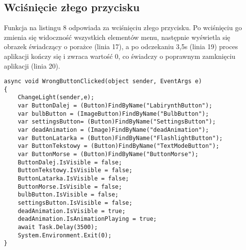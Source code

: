 \subsection{Wciśnięcie złego przycisku}
\hspace{0.60cm}Funkcja na listingu 8 odpowiada za wciśnięciu złego przycisku. Po wciśnięciu go zmienia się widoczność wszystkich elementów menu, następnie wyświetla się obrazek świadczący o porażce (linia 17), a po odczekaniu 3,5s (linia 19) proces aplikacji kończy się i zwraca wartość 0, co świadczy o poprawnym zamknięciu aplikacji (linia 20).

\begin{lstlisting}[caption=WrongButton]
async void WrongButtonClicked(object sender, EventArgs e)
{
	ChangeLight(sender,e);
	var ButtonDalej = (Button)FindByName("LabirynthButton");
	var bulbButton = (ImageButton)FindByName("BulbButton");
	var settingsButton= (Button)FindByName("SettingsButton");
	var deadAnimation = (Image)FindByName("deadAnimation");
	var ButtonLatarka = (Button)FindByName("FlashlightButton");
	var ButtonTekstowy = (Button)FindByName("TextModeButton");
	var ButtonMorse = (Button)FindByName("ButtonMorse");
	ButtonDalej.IsVisible = false;
	ButtonTekstowy.IsVisible = false;
	ButtonLatarka.IsVisible = false;
	ButtonMorse.IsVisible = false;
	bulbButton.IsVisible = false;
	settingsButton.IsVisible = false;
	deadAnimation.IsVisible = true;
	deadAnimation.IsAnimationPlaying = true;
	await Task.Delay(3500);
	System.Environment.Exit(0);
}
\end{lstlisting}

